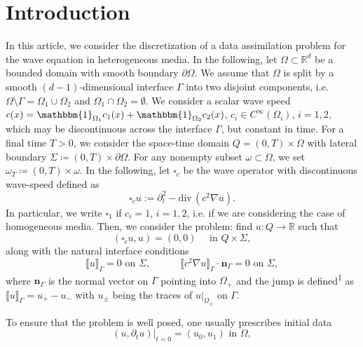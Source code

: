\documentclass[sn-mathphys-num]{sn-jnl}
\numberwithin{equation}{section}
\newcommand{\jump}[1]{\llbracket#1\rrbracket}
\renewcommand{\div}{\mathrm{div}\,}  %
\newcommand{\wop}{\square_c}
\newcommand{\dt}{\partial_t}
\begin{document}
\section{Introduction}
\noindent In this article, we consider the discretization of a data assimilation problem for the wave equation in heterogeneous media. In the following, let $\Omega \subset \mathbb{R}^d$ be a bounded domain with smooth boundary $\partial \Omega$. We assume that $\Omega$ is split by a smooth $(d-1)$-dimensional 
interface $\Gamma$ into two disjoint components, i.e.\ $\Omega \setminus \Gamma = \Omega_1 \cup 
\Omega_2$ and $\Omega_1 \cap \Omega_2 = \emptyset$.
 We consider a scalar wave speed $c(x) = \mathbbm{1}_{\Omega_1} c_1(x) + \mathbbm{1}_{\Omega_2} c_2(x)$, $c_i \in C^\infty(\Omega_i)$, $i = 1,2$, which may be discontinuous across the interface $\Gamma$, but constant in time. For a final time $T > 0$, we consider the space-time domain $Q = (0,T) \times \Omega$ with lateral boundary $\Sigma \coloneqq (0,T) \times \partial \Omega$. For any nonempty subset $\omega \subset \Omega$, we set $\omega_T \coloneqq (0,T) \times \omega$. In the following, let $\wop$ be the wave operator with discontinuous wave-speed defined as 
\begin{equation*}
    \wop u := \partial_t^2 - \div(c^2 \nabla u).
\end{equation*}
In particular, we write $\square_1$ if $c_i = 1$, $i = 1,2$, i.e. if we are considering the case of homogeneous media. 
Then, we consider the problem: find $u : Q \rightarrow \mathbb{R}$ such that 
\begin{equation}\label{eq:waveEquation}
        (\wop u, u) = (0,0) \quad \text{ in } Q \times \Sigma,
\end{equation}
along with the natural interface conditions 
\begin{equation}\label{eq:IF-conditions}
	\jump{u}_{\Gamma} = 0 \text{ on } \Sigma, \qquad 
	\quad \jump{c^2 \nabla u}_{\Gamma} \cdot \mathbf{n}_{\Gamma} = 0 \text{ on } \Sigma, 
\end{equation}
where $\mathbf{n}_{\Gamma}$ is the normal vector on $\Gamma$ pointing into $\Omega_+$ 
and the jump is defined\textsuperscript{1}\footnotemark {} as $\jump{u}_{\Gamma} = u_{+}-u_{-}$ with $u_{\pm}$ being the traces 
of $u|_{\Omega_{\pm}}$ on $\Gamma$. \par 
\noindent To ensure that the problem is well posed, one usually prescribes initial data
\begin{equation}\label{eq:initialData}
    (u,\dt u) \vert_{t = 0} = (u_0,u_1) \text{ in } \Omega, \tag{IVP} 
\end{equation}
\end{document}
